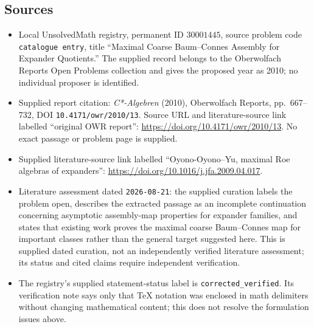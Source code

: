 \documentclass[11pt]{article}
\begin{document}
\subsection{Sources}
\begin{itemize}
\item Local UnsolvedMath registry, permanent ID \(30001445\), source problem code \texttt{catalogue entry}, title ``Maximal Coarse Baum--Connes Assembly for Expander Quotients.'' The supplied record belongs to the Oberwolfach Reports Open Problems collection and gives the proposed year as 2010; no individual proposer is identified.
\item Supplied report citation: \emph{C*-Algebren} (2010), Oberwolfach Reports, pp.\ 667--732, DOI \texttt{10.4171/owr/2010/13}. Source URL and literature-source link labelled ``original OWR report'': \url{https://doi.org/10.4171/owr/2010/13}. No exact passage or problem page is supplied.
\item Supplied literature-source link labelled ``Oyono-Oyono--Yu, maximal Roe algebras of expanders'': \url{https://doi.org/10.1016/j.jfa.2009.04.017}.
\item Literature assessment dated \texttt{2026-08-21}: the supplied curation labels the problem open, describes the extracted passage as an incomplete continuation concerning asymptotic assembly-map properties for expander families, and states that existing work proves the maximal coarse Baum--Connes map for important classes rather than the general target suggested here. This is supplied dated curation, not an independently verified literature assessment; its status and cited claims require independent verification.
\item The registry's supplied statement-status label is \texttt{corrected\_verified}. Its verification note says only that TeX notation was enclosed in math delimiters without changing mathematical content; this does not resolve the formulation issues above.
\end{itemize}
\end{document}
